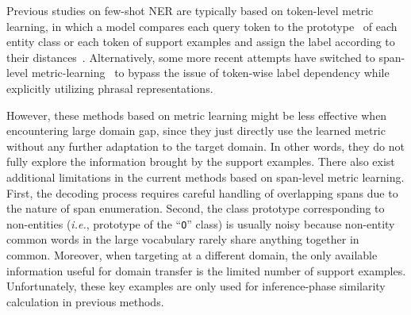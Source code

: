 \documentclass[11pt]{article}
\newcommand\ie{\textit{i.e.}}
\begin{document}
Previous studies on few-shot NER are typically based on token-level metric learning, in which a model compares each query token to the prototype~\citep{snell2017proto} of each entity class or each token of support examples and assign the label according to their distances~\citep{fritzler2019few, hou2020few, yang2020simple}. Alternatively, some more recent attempts have switched to span-level metric-learning~\citep{yu2021fewShot,wang2021enhanced} to bypass the issue of token-wise label dependency while explicitly utilizing phrasal representations.



However, these methods based on metric learning might be less effective when encountering large domain gap, since they just directly use the learned metric without any further adaptation to the target domain. In other words, they do not fully explore the information brought by the support examples.
There also exist additional limitations in the current methods based on span-level metric learning.
First, the decoding process 
requires careful handling of
overlapping spans due to the nature of span enumeration.
Second, the class prototype corresponding to non-entities (\ie, prototype of the ``\texttt{O}'' class) is usually noisy because 
non-entity common words in the large vocabulary rarely share anything together in common.
Moreover, when targeting at a different domain, the only available information useful for domain transfer is the limited number of support examples.
Unfortunately, these key examples are only used for inference-phase similarity calculation in previous methods.
\end{document}

